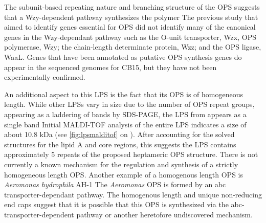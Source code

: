
The subunit-based repeating nature and branching structure of the \caulobacter{} \ac{OPS} suggests that a Wzy-dependent pathway
synthesizes the polymer The previous study that aimed to identify genes
essential for \ac{OPS} did not identify many of the canonical genes in the Wzy-dependant
pathway such as the O-unit transporter, Wzx, \ac{OPS} polymerase, Wzy; the
chain-length determinate protein, Wzz; and the \ac{OPS} ligase, WaaL. Genes that have been
annotated as putative \ac{OPS} synthesis genes do appear in the sequenced genomes for \caulobacter
CB15, but they have not been experimentally confirmed.

An additional aspect to this \ac{LPS} is the fact that its \ac{OPS} is of homogeneous length. While
other \ac{LPS}s vary in size due to the number of \ac{OPS} repeat groups, appearing as a laddering
of bands by \ac{SDS-PAGE}, the \ac{LPS} from \caulobacter appears as a single
band Initial \ac{MALDI-TOF} analysis of the entire \ac{LPS} indicates a size of
about 10.8 kDa (see \cref{fig:lpsmalditof} on ).  After accounting for the
solved structures for the lipid A and core regions, this suggests the \ac{LPS} contains
approximately 5 repeats of the proposed heptameric \ac{OPS} structure.  There is not currently a
known mechanism for the regulation and synthesis of a strictly homogeneous
length \ac{OPS}. Another example of a homogenous length \ac{OPS} is
\textit{Aeromonas hydrophila} AH-1 The
\textit{Aeromonas} \ac{OPS} is formed by an \ac{abc} transporter-dependant
pathway. The homogenous length and unique non-reducing end caps suggest that
it is possible that this \ac{OPS} is synthesized via the \ac{abc}-transporter-dependent
pathway or another heretofore undiscovered mechanism. 

